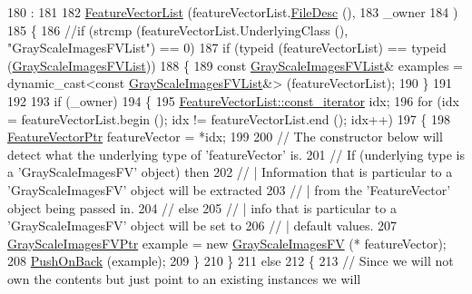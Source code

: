 \begin{DoxyCode}
180                                               :
181 
182   \hyperlink{class_k_k_m_l_l_1_1_feature_vector_list_a102284896708eb82b5879dcf9a92e974}{FeatureVectorList} (featureVectorList.\hyperlink{class_k_k_m_l_l_1_1_feature_vector_list_a736923be9c4ac7553a5aa87dd24efd16}{FileDesc} (),
183                      \_owner
184                     )
185 \{
186   \textcolor{comment}{//if  (strcmp (featureVectorList.UnderlyingClass (), "GrayScaleImagesFVList") == 0)}
187   \textcolor{keywordflow}{if}  (\textcolor{keyword}{typeid} (featureVectorList) == \textcolor{keyword}{typeid} (\hyperlink{class_k_k_m_l_l_1_1_gray_scale_images_f_v_list_aabed2fbe6de7f052cc63dc941a863372}{GrayScaleImagesFVList}))
188   \{
189     \textcolor{keyword}{const} \hyperlink{class_k_k_m_l_l_1_1_gray_scale_images_f_v_list}{GrayScaleImagesFVList}&  examples = \textcolor{keyword}{dynamic\_cast<}\textcolor{keyword}{const }
      \hyperlink{class_k_k_m_l_l_1_1_gray_scale_images_f_v_list}{GrayScaleImagesFVList}&\textcolor{keyword}{>} (featureVectorList);
190   \}
191 
192 
193   \textcolor{keywordflow}{if}  (\_owner)
194   \{
195     \hyperlink{class_k_k_b_1_1_k_k_queue_aeb057c9c010446f46f57c1e355f981f1}{FeatureVectorList::const\_iterator}  idx;
196     \textcolor{keywordflow}{for}  (idx = featureVectorList.begin ();  idx != featureVectorList.end ();  idx++)
197     \{
198       \hyperlink{class_k_k_m_l_l_1_1_feature_vector}{FeatureVectorPtr} featureVector = *idx;
199       
200       \textcolor{comment}{// The constructor below will detect what the underlying type of 'featureVector' is.  }
201       \textcolor{comment}{// If (underlying type is a 'GrayScaleImagesFV' object)  then}
202       \textcolor{comment}{//   | Information that is particular to a 'GrayScaleImagesFV' object will be extracted}
203       \textcolor{comment}{//   | from the 'FeatureVector' object being passed in.}
204       \textcolor{comment}{// else}
205       \textcolor{comment}{//   | info that is particular to a 'GrayScaleImagesFV' object will be set to}
206       \textcolor{comment}{//   | default values.}
207       \hyperlink{class_k_k_m_l_l_1_1_gray_scale_images_f_v}{GrayScaleImagesFVPtr}  example = \textcolor{keyword}{new} \hyperlink{class_k_k_m_l_l_1_1_gray_scale_images_f_v}{GrayScaleImagesFV} (*
      featureVector);
208       \hyperlink{class_k_k_m_l_l_1_1_feature_vector_list_abd43779a90a6aa3db1de8092be877bdb}{PushOnBack} (example);
209     \}
210   \}
211   \textcolor{keywordflow}{else}
212   \{
213     \textcolor{comment}{// Since we will not own the contents but just point to an existing instances we will }

\end{DoxyCode}
